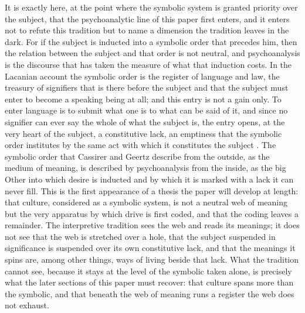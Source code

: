 It is exactly here, at the point where the symbolic system is granted priority over the subject, that the psychoanalytic line of this paper first enters, and it enters not to refute this tradition but to name a dimension the tradition leaves in the dark. For if the subject is inducted into a symbolic order that precedes him, then the relation between the subject and that order is not neutral, and psychoanalysis is the discourse that has taken the measure of what that induction costs. In the Lacanian account the symbolic order is the register of language and law, the treasury of signifiers that is there before the subject and that the subject must enter to become a speaking being at all; and this entry is not a gain only. To enter language is to submit what one is to what can be said of it, and since no signifier can ever say the whole of what the subject is, the entry opens, at the very heart of the subject, a constitutive lack, an emptiness that the symbolic order institutes by the same act with which it constitutes the subject \parencite{lacan2006ecrits}. The symbolic order that Cassirer and Geertz describe from the outside, as the medium of meaning, is described by psychoanalysis from the inside, as the big Other into which desire is inducted and by which it is marked with a lack it can never fill. This is the first appearance of a thesis the paper will develop at length: that culture, considered as a symbolic system, is not a neutral web of meaning but the very apparatus by which drive is first coded, and that the coding leaves a remainder. The interpretive tradition sees the web and reads its meanings; it does not see that the web is stretched over a hole, that the subject suspended in significance is suspended over its own constitutive lack, and that the meanings it spins are, among other things, ways of living beside that lack. What the tradition cannot see, because it stays at the level of the symbolic taken alone, is precisely what the later sections of this paper must recover: that culture spans more than the symbolic, and that beneath the web of meaning runs a register the web does not exhaust.
